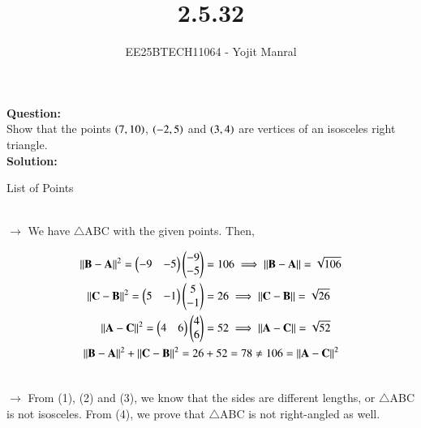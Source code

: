 \documentclass[journal]{IEEEtran}
\begin{document}

\vspace{3cm}

\title{2.5.32}
\author{EE25BTECH11064 - Yojit Manral}

\maketitle
{\let\newpage\relax\maketitle}
\renewcommand{\thefigure}{\theenumi}
\renewcommand{\thetable}{\theenumi}
\setlength{\intextsep}{10pt} %

\textbf{Question:}\\
Show that the points $\left(7,10\right)$, $\left(-2,5\right)$ and $\left(3,4\right)$ are vertices of an isosceles right triangle.\\

\textbf{Solution:}\\
\begin{table}[h!]    
  \centering
  
  \caption{List of Points}
  \label{Table_1}
\end{table}\\

$\rightarrow$ We have $\triangle$ABC with the given points. Then,

\begin{align}
    \left\lVert\mathbf{B} - \mathbf{A}\right\rVert^2 = \begin{pmatrix}-9 & -5\end{pmatrix}\begin{pmatrix}-9\\-5\end{pmatrix} &= 106 \implies \left\lVert\mathbf{B} - \mathbf{A}\right\rVert = \sqrt{106}\\
    \left\lVert\mathbf{C} - \mathbf{B}\right\rVert^2 = \begin{pmatrix}5 & -1\end{pmatrix}\begin{pmatrix}5\\-1\end{pmatrix} &= 26 \implies \left\lVert\mathbf{C} - \mathbf{B}\right\rVert = \sqrt{26}\\
    \left\lVert\mathbf{A} - \mathbf{C}\right\rVert^2 = \begin{pmatrix}4 & 6\end{pmatrix}\begin{pmatrix}4\\6\end{pmatrix} &= 52 \implies \left\lVert\mathbf{A} - \mathbf{C}\right\rVert = \sqrt{52}\\
    \left\lVert\mathbf{B} - \mathbf{A}\right\rVert^2 + \left\lVert\mathbf{C} - \mathbf{B}\right\rVert^2 = 26 &+ 52 = 78 \neq 106 = \left\lVert\mathbf{A} - \mathbf{C}\right\rVert^2\\
    \notag
\end{align}

$\rightarrow$ From (1), (2) and (3), we know that the sides are different lengths, or $\triangle$ABC is not isosceles. From (4), we prove that $\triangle$ABC is not right-angled as well.
\end{document}
